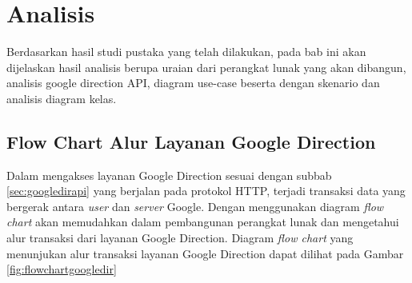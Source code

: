\chapter{Analisis}
\label{chap:analisis}

Berdasarkan hasil studi pustaka yang telah dilakukan, pada bab ini akan dijelaskan hasil analisis berupa uraian dari perangkat lunak yang akan dibangun, analisis google direction API, diagram use-case beserta dengan skenario dan analisis diagram kelas.

\section{Flow Chart Alur Layanan Google Direction}
\label{sec:flowchartgoogledir}

Dalam mengakses layanan Google Direction sesuai dengan subbab \ref{sec:googledirapi} yang berjalan pada protokol HTTP, terjadi transaksi data yang bergerak antara \textit{user} dan \textit{server} Google. Dengan menggunakan diagram \textit{flow chart} akan memudahkan dalam pembangunan perangkat lunak dan mengetahui alur transaksi dari layanan Google Direction. Diagram \textit{flow chart} yang menunjukan alur transaksi layanan Google Direction dapat dilihat pada Gambar \ref{fig:flowchartgoogledir}

